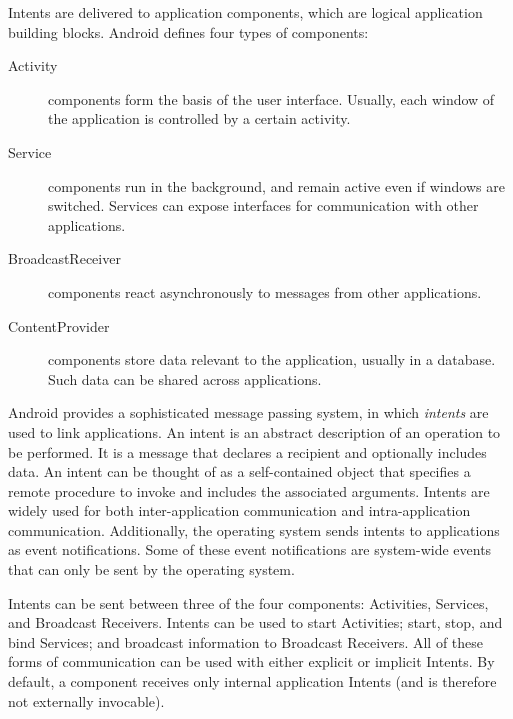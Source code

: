 Intents are delivered to application components, which are logical application building blocks. Android defines four types of components:

\begin{description}
	\item[Activity] components form the basis of the user interface. Usually, each window of the application is controlled by a certain activity.
	\item[Service] components run in the background, and remain active even if windows are switched. Services can expose interfaces for communication with other applications.
	\item[BroadcastReceiver] components react asynchronously to messages from other applications.
	\item[ContentProvider] components store data relevant to the application, usually in a database. Such data can be shared across applications.
\end{description}

Android provides a sophisticated message passing system, in which \emph{intents} are used to link applications. An intent is an abstract description of an operation to be performed. It is a message that declares a recipient and optionally includes data. An intent can be thought of as a self-contained object that specifies a remote procedure to invoke and includes the associated arguments. Intents are widely used for both inter-application communication and intra-application communication. Additionally, the operating system sends intents to applications as event notifications. Some of these event notifications are system-wide events that can only be sent by the operating system.

Intents can be sent between three of the four components: Activities, Services, and Broadcast Receivers. Intents can be used to start Activities; start, stop, and bind Services; and broadcast information to Broadcast Receivers. All of these forms of communication can be used with either explicit or implicit Intents. By default, a component receives only internal application Intents (and is therefore not externally invocable).

